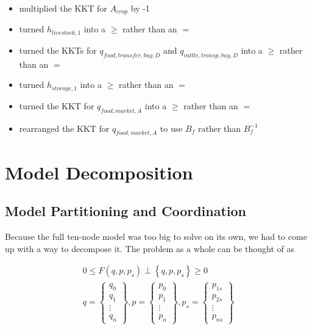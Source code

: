 \documentclass[letter,12pt]{article}
\begin{document}
\begin{itemize}
\item multiplied the KKT for $A_{crop}$ by -1
\item turned $h_{livestock,1}$ into a $\geq$ rather than an $=$
\item turned the KKTs for $q_{food,transfer,buy,D}$ and $q_{cattle,transp,buy,D}$ into a $\geq$ rather than an $=$
\item turned $h_{storage,1}$ into a $\geq$ rather than an $=$
\item turned the KKT for $q_{food,market,A}$ into a $\geq$ rather than an $=$
\item rearranged the KKT for $q_{food,market,A}$ to use $B_f$ rather than $B_f^{-1}$
\end{itemize}

\section{Model Decomposition}

\subsection{Model Partitioning and Coordination}

Because the full ten-node model was too big to solve on its own, we had to come up with a way to decompose it.  The problem as a whole can be thought of as

\begin{gather}
0 \leq F \left(q, p, p_s\right) \perp \left\{q,p,p_s\right\} \geq 0 \\
q = \left\{ \begin{array}{c}
q_0 \\
q_1 \\
\vdots \\
q_n \end{array} \right\}, p = \left\{ \begin{array}{c}
p_0 \\
p_1 \\
\vdots \\
p_n \end{array} \right\}, p_s = \left\{ \begin{array}{c}
p_{1s} \\
p_{2s} \\
\vdots \\
p_{ns} \end{array} \right\}
\end{gather}
\end{document}
